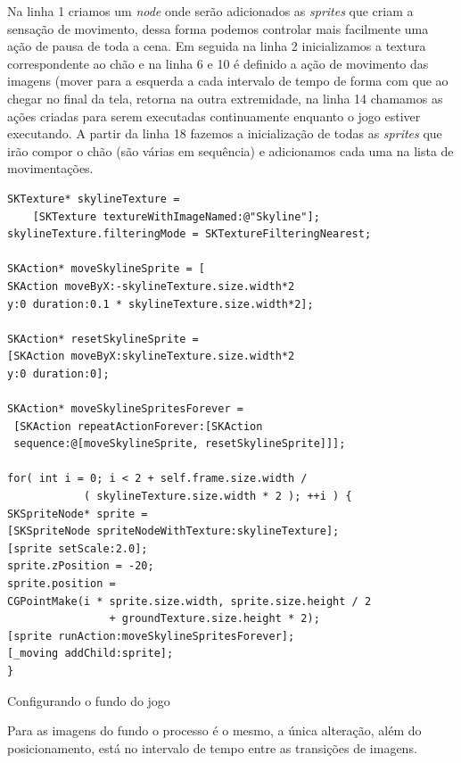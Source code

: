\documentclass[a4paper,12pt,brazil,oneside]{book}
\begin{document}
Na linha 1 criamos um \emph{node} onde serão adicionados as \emph{sprites} que criam a sensação de movimento, dessa forma podemos controlar mais facilmente uma ação de pausa de toda a cena. Em seguida na linha 2 inicializamos a textura correspondente ao chão e na linha 6 e 10 é definido a ação de movimento das imagens (mover para a esquerda a cada intervalo de tempo de forma com que ao chegar no final da tela, retorna na outra extremidade, na linha 14 chamamos as ações criadas para serem executadas continuamente enquanto o jogo estiver executando.
A partir da linha 18 fazemos a inicialização de todas as \emph{sprites} que irão compor o chão (são várias em sequência) e adicionamos cada uma na lista de movimentações.

\begin{listing}[H]
\begin{verbatim}
SKTexture* skylineTexture = 
	[SKTexture textureWithImageNamed:@"Skyline"];
skylineTexture.filteringMode = SKTextureFilteringNearest;
        
SKAction* moveSkylineSprite = [
SKAction moveByX:-skylineTexture.size.width*2 
y:0 duration:0.1 * skylineTexture.size.width*2];

SKAction* resetSkylineSprite = 
[SKAction moveByX:skylineTexture.size.width*2 
y:0 duration:0];

SKAction* moveSkylineSpritesForever =
 [SKAction repeatActionForever:[SKAction 
 sequence:@[moveSkylineSprite, resetSkylineSprite]]];
        
for( int i = 0; i < 2 + self.frame.size.width / 
			( skylineTexture.size.width * 2 ); ++i ) {
SKSpriteNode* sprite = 
[SKSpriteNode spriteNodeWithTexture:skylineTexture];
[sprite setScale:2.0];
sprite.zPosition = -20;
sprite.position = 
CGPointMake(i * sprite.size.width, sprite.size.height / 2 
				+ groundTexture.size.height * 2);
[sprite runAction:moveSkylineSpritesForever];
[_moving addChild:sprite];
}
\end{verbatim}
\caption{Configurando o fundo do jogo}
\end{listing}

Para as imagens do fundo o processo é o mesmo, a única alteração, além do posicionamento, está no intervalo de tempo entre as transições de imagens.
\end{document}
